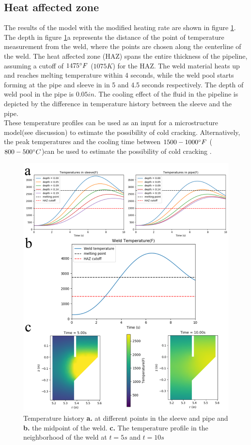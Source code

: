 \documentclass{article}
\makeatletter
\newcommand{\autocitel}[1]{\autocite{#1}\checknextarg}
\newcommand{\checknextarg}{\@ifnextchar\bgroup{\gobblenextarg}{}}
\newcommand{\gobblenextarg}[1]{$^,$\autocite{#1}\@ifnextchar\bgroup{\gobblenextarg}{}}
\makeatother
\begin{document}
\subsection{Heat affected zone}
	The results of the model with the modified heating rate are shown in figure \ref{fig3}. The depth in figure \ref{fig3}a represents the distance of the point of temperature measurement from the weld, where the points are chosen along the centerline of the weld. The heat affected zone (HAZ) spans the entire thickness of the pipeline, assuming a cutoff of $1475 \degree F$ ($1075 K$)\autocitel{cheng2004weld} for the HAZ. The weld material heats up and reaches melting temperature within 4 seconds, while the weld pool starts forming at the pipe  and sleeve in in 5 and 4.5 seconds respectively. The depth of weld pool in the pipe is $0.05 in$. The cooling effect of the fluid in the pipeline is depicted by the difference in temperature history between the sleeve and the pipe. \\ 
	These temperature profiles can be used as an input for a microstructure model(see discussion) to estimate the possibility of cold cracking. Alternatively, the peak temperatures and the cooling time between $1500-1000 \degree F$ ($800-500 \degree C$)can be used to estimate the possibility of cold cracking \autocitel{lobanov2013formation}. 

\begin{figure}[h]
	\centering
	\includegraphics[width=12 cm]{linear_results.png}
	\caption{ Temperature history \textbf{a.} at different points in the sleeve and pipe and \textbf{b.} the midpoint of the weld. \textbf{c.} The temperature profile in the neighborhood of the weld at $t = 5s$ and $t = 10s$ }
	\label{fig3}
\end{figure}
\end{document}
